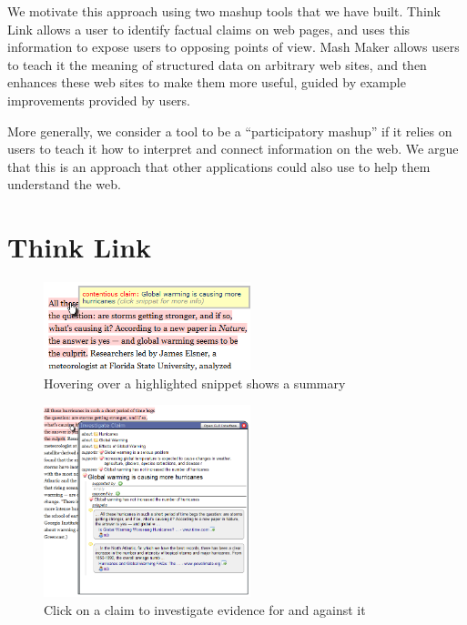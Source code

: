 \documentclass{chi2009}
\begin{document}
We motivate this approach using two mashup tools that we have built. Think Link allows a user to identify factual claims on web pages, and uses this information to expose users to opposing points of view. Mash Maker allows users to teach it the meaning of structured data on arbitrary web sites, and then enhances these web sites to make them more useful, guided by example improvements provided by users.

More generally, we consider a tool to be a ``participatory mashup'' if it relies on users to teach it how to interpret and connect information on the web. We argue that this is an approach that other applications could also use to help them understand the web.

\section{Think Link}

\begin{figure}[tb]
	\begin{center}
	\includegraphics[width=6cm]{../screenshots/highlight_crop.png}
	\caption{Hovering over a highlighted snippet shows a summary}
	\label{highlight}
	\end{center}
\end{figure}

\begin{figure}[tb]
	\begin{center}
	\includegraphics[width=6cm]{../screenshots/claim_popup_crop2.png}
	\caption{Click on a claim to investigate evidence for and against it}
	\label{claimview}
	\end{center}
\end{figure}
\end{document}
